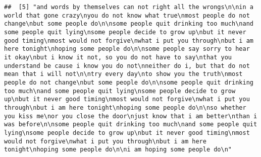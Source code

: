\documentclass[]{article}
\begin{document}
\begin{verbatim}
##  [5] "and words by themselves can not right all the wrongs\n\nin a world that gone crazy\nyou do not know what true\nmost people do not change\nbut some people do\n\nsome people quit drinking too much\nand some people quit lying\nsome people decide to grow up\nbut it never good timing\nmost would not forgive\nwhat i put you through\nbut i am here tonight\nhoping some people do\n\nsome people say sorry to hear it okay\nbut i know it not, so you do not have to say\nthat you understand be cause i know you do not\nneither do i, but that do not mean that i will not\n\ntry every day\nto show you the truth\nmost people do not change\nbut some people do\n\nsome people quit drinking too much\nand some people quit lying\nsome people decide to grow up\nbut it never good timing\nmost would not forgive\nwhat i put you through\nbut i am here tonight\nhoping some people do\n\nso whether you kiss me\nor you close the door\njust know that i am better\nthan i was before\n\nsome people quit drinking too much\nand some people quit lying\nsome people decide to grow up\nbut it never good timing\nmost would not forgive\nwhat i put you through\nbut i am here tonight\nhoping some people do\n\ni am hoping some people do\n"                                                                                                                                                                                                                                                                                                                                                                                                                                                                                                                                                                                                                                                                                                                                                                                                                                                                                                                                                                                                                                                                                                                                                                                                                                                                                                                                                                                                                                                                                                                                                                                                                                                                                                                        

\end{verbatim}
\end{document}
